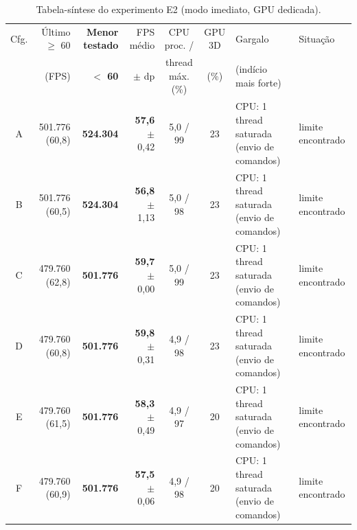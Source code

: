 \begin{table}[H]
\centering
\caption{Tabela-síntese do experimento E2 (modo imediato, GPU dedicada).}
\label{tab:sintese_e2}
\scriptsize
\setlength{\tabcolsep}{3pt}
\begin{tabularx}{\textwidth}{c r r r c c L P{1.6cm}}
\toprule
Cfg. & Último $\geq$ 60 & \textbf{Menor testado} & FPS médio & CPU proc. / & GPU 3D & Gargalo & Situação \\
 & (FPS) & \textbf{$<$ 60} & $\pm$ dp & thread máx. (\%) & (\%) & (indício mais forte) & \\
\midrule
A & 501.776 (60,8) & \textbf{524.304} & \textbf{57,6} $\pm$ 0,42 & 5,0 / 99 & 23 & CPU: 1 thread saturada (envio de comandos) & limite encontrado \\
B & 501.776 (60,5) & \textbf{524.304} & \textbf{56,8} $\pm$ 1,13 & 5,0 / 98 & 23 & CPU: 1 thread saturada (envio de comandos) & limite encontrado \\
C & 479.760 (62,8) & \textbf{501.776} & \textbf{59,7} $\pm$ 0,00 & 5,0 / 99 & 23 & CPU: 1 thread saturada (envio de comandos) & limite encontrado \\
D & 479.760 (60,8) & \textbf{501.776} & \textbf{59,8} $\pm$ 0,31 & 4,9 / 98 & 23 & CPU: 1 thread saturada (envio de comandos) & limite encontrado \\
E & 479.760 (61,5) & \textbf{501.776} & \textbf{58,3} $\pm$ 0,49 & 4,9 / 97 & 20 & CPU: 1 thread saturada (envio de comandos) & limite encontrado \\
F & 479.760 (60,9) & \textbf{501.776} & \textbf{57,5} $\pm$ 0,06 & 4,9 / 98 & 20 & CPU: 1 thread saturada (envio de comandos) & limite encontrado \\
\bottomrule
\end{tabularx}
\end{table}
